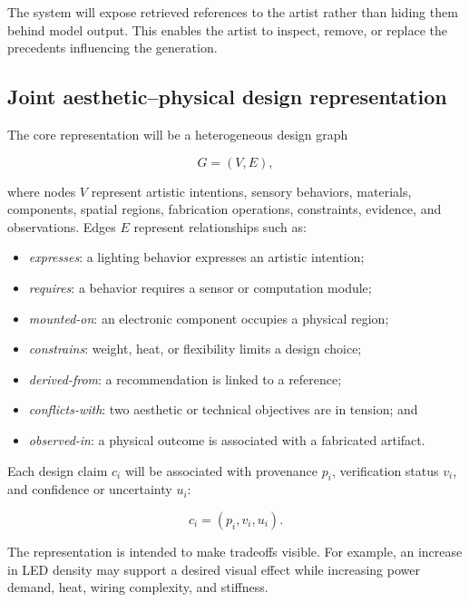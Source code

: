 \documentclass{article}
\begin{document}
The system will expose retrieved references to the artist rather than hiding
them behind model output. This enables the artist to inspect, remove, or replace
the precedents influencing the generation.

\subsection{Joint aesthetic--physical design representation}

The core representation will be a heterogeneous design graph

\begin{equation}
G = (V, E),
\end{equation}

where nodes $V$ represent artistic intentions, sensory behaviors, materials,
components, spatial regions, fabrication operations, constraints, evidence,
and observations. Edges $E$ represent relationships such as:

\begin{itemize}[leftmargin=*]
    \item \emph{expresses}: a lighting behavior expresses an artistic intention;
    \item \emph{requires}: a behavior requires a sensor or computation module;
    \item \emph{mounted-on}: an electronic component occupies a physical
    region;
    \item \emph{constrains}: weight, heat, or flexibility limits a design
    choice;
    \item \emph{derived-from}: a recommendation is linked to a reference;
    \item \emph{conflicts-with}: two aesthetic or technical objectives are in
    tension; and
    \item \emph{observed-in}: a physical outcome is associated with a fabricated
    artifact.
\end{itemize}

Each design claim $c_i$ will be associated with provenance $p_i$, verification
status $v_i$, and confidence or uncertainty $u_i$:

\begin{equation}
c_i = (p_i, v_i, u_i).
\end{equation}

The representation is intended to make tradeoffs visible. For example, an
increase in LED density may support a desired visual effect while increasing
power demand, heat, wiring complexity, and stiffness.
\end{document}
